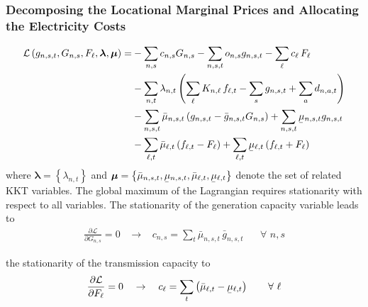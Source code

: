 \documentclass[11pt]{article}
\newcommand{\ubar}[1]{\underaccent{\bar}{#1}}
\newcommand{\generation}[1][n]{g_{#1,s,t}}
\newcommand{\generationpotential}{\bar{g}_{n,s,t}}
\newcommand{\capacityGeneration}{G_{n,s}}
\newcommand{\capacityFlow}{F_{\ell}}
\newcommand{\capexGeneration}{c_{n,s}}
\newcommand{\capexFlow}{c_{\ell}}
\newcommand{\opexGeneration}[1][n]{o_{#1,s}}
\newcommand{\demand}[1][n]{d_{#1,a,t}}
\newcommand{\incidence}[1][n]{K_{#1,\ell}}
\newcommand{\mulowergeneration}[1][n]{\ubar{\mu}_{#1,s,t}}
\newcommand{\muuppergeneration}[1][n]{\bar{\mu}_{#1,s,t}}
\newcommand{\mulowerflow}{\ubar{\mu}_{\ell,t}}
\newcommand{\muupperflow}{\bar{\mu}_{\ell,t}}
\newcommand{\lmp}[1][n]{\lambda_{#1,t}}
\newcommand{\flow}{f_{\ell,t}}
\newcommand{\cycle}{C_{\ell,c}}
\newcommand{\impedance}{x_\ell}
\newcommand{\cycleprice}{\lambda_{c,t}}
\newcommand{\lagrangian}{\mathcal{L}}
\newcommand{\Forall}[1]{\hspace{20pt} \forall \,\, #1 }
\newcommand{\pdv}[2]{\frac{\partial #1}{\partial #2}}
\begin{document}
\subsubsection*{Decomposing the Locational Marginal Prices and Allocating the Electricity Costs}
\begin{align}
 \lagrangian\left(\generation, \capacityGeneration, \capacityFlow, \boldsymbol{\lambda}, \boldsymbol{\mu} \right)   = &- \sum_{n,s} \capexGeneration \capacityGeneration - \sum_{n, s, t} \opexGeneration \generation - \sum_{\ell} \capexFlow \, \capacityFlow  \\
 &- \sum_{n,t} \lmp \left(\sum_\ell \incidence \, \flow  - \sum_s \generation + \sum_a \demand  \right)  \\ 
 &- \sum_{n,s,t} \muuppergeneration \left( \generation - \generationpotential \capacityGeneration \right)  + \sum_{n,s,t} \mulowergeneration \generation  \\
 &- \sum_{\ell,t} \muupperflow \left( \flow - \capacityFlow \right) + \sum_{\ell,t} \mulowerflow \left( \flow + \capacityFlow \right)     
\end{align}
% 
where $\boldsymbol{\lambda} = \left\lbrace \lmp \right\rbrace $ and $\boldsymbol{\mu} = \left\lbrace \muuppergeneration, \mulowergeneration, \muupperflow, \mulowerflow \right\rbrace $ denote the set of related KKT variables. The global maximum of the Lagrangian requires stationarity with respect to all variables. The stationarity of the generation capacity variable leads to 
\begin{align}
 \pdv{\lagrangian}{\capacityGeneration}  = 0 \hspace{10pt} \rightarrow \hspace{10pt} \capexGeneration =  \sum_t \muuppergeneration \, \generationpotential  \Forall{n,s}
 \label{eq:capexGeneration_duality}
\end{align}

the stationarity of the transmission capacity to
\begin{align}
 \pdv{\lagrangian}{\capacityFlow} = 0 \hspace{10pt} \rightarrow \hspace{10pt} \capexFlow =  \sum_t \left( \muupperflow - \mulowerflow \right) \Forall{\ell}
 \label{eq:capexFlow_duality}
\end{align}
\end{document}
